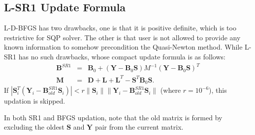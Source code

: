 \documentclass[annual]{acmsiggraph}
\newcommand{\E}[1]{\mathbf{#1}}
\begin{document}
\subsection{L-SR1 Update Formula}
L-D-BFGS has two drawbacks, one is that it is positive definite, which is too restrictive for SQP solver. The other is that user is not allowed to provide any known information to somehow precondition the Quasi-Newton method. While L-SR1 has no such drawbacks, whose compact update formula is as follows:
\begin{eqnarray*}
\E{B}^{SR1}&=&\E{B}_0+(\E{Y}-\E{B}_0\E{S})M^{-1}(\E{Y}-\E{B}_0\E{S})^T	\\
\E{M}&=&\E{D}+\E{L}+\E{L}^T-\E{S}^T\E{B}_0\E{S}.
\end{eqnarray*}
If $|\E{S}_i^T(\E{Y}_i-\E{B}^{SR1}_{old}\E{S}_i)| < r\|\E{S}_i\|\|\E{Y}_i-\E{B}^{SR1}_{old}\E{S}_i\|$ (where $r=10^{-6}$), this updation is skipped.

In both SR1 and BFGS updation, note that the old matrix is formed by excluding the oldest $\E{S}$ and $\E{Y}$ pair from the current matrix.



\end{document}
